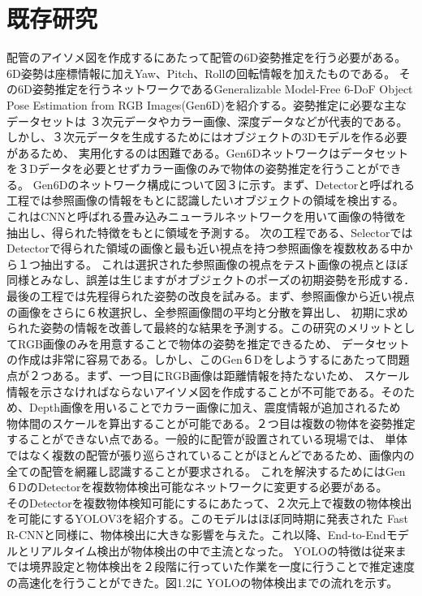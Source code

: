 \section{既存研究}
配管のアイソメ図を作成するにあたって配管の6D姿勢推定を行う必要がある。6D姿勢は座標情報に加えYaw、Pitch、Rollの回転情報を加えたものである。
その6D姿勢推定を行うネットワークであるGeneralizable Model-Free 6-DoF Object Pose Estimation from RGB Images(Gen6D)を紹介する。姿勢推定に必要な主なデータセットは
３次元データやカラー画像、深度データなどが代表的である。しかし、３次元データを生成するためにはオブジェクトの3Dモデルを作る必要があるため、
実用化するのは困難である。Gen6Dネットワークはデータセットを３Dデータを必要とせずカラー画像のみで物体の姿勢推定を行うことができる。
Gen6Dのネットワーク構成について図３に示す。まず、Detectorと呼ばれる工程では参照画像の情報をもとに認識したいオブジェクトの領域を検出する。
これはCNNと呼ばれる畳み込みニューラルネットワークを用いて画像の特徴を抽出し、得られた特徴をもとに領域を予測する。
次の工程である、SelectorではDetectorで得られた領域の画像と最も近い視点を持つ参照画像を複数枚ある中から１つ抽出する。
これは選択された参照画像の視点をテスト画像の視点とほぼ同様とみなし、誤差は生じますがオブジェクトのポーズの初期姿勢を形成する．
最後の工程では先程得られた姿勢の改良を試みる。まず、参照画像から近い視点の画像をさらに６枚選択し、全参照画像間の平均と分散を算出し、
初期に求められた姿勢の情報を改善して最終的な結果を予測する。この研究のメリットとしてRGB画像のみを用意することで物体の姿勢を推定できるため、
データセットの作成は非常に容易である。しかし、このGen６Dをしようするにあたって問題点が２つある。まず、一つ目にRGB画像は距離情報を持たないため、
スケール情報を示さなければならないアイソメ図を作成することが不可能である。そのため、Depth画像を用いることでカラー画像に加え、震度情報が追加されるため
物体間のスケールを算出することが可能である。２つ目は複数の物体を姿勢推定することができない点である。一般的に配管が設置されている現場では、
単体ではなく複数の配管が張り巡らされていることがほとんどであるため、画像内の全ての配管を網羅し認識することが要求される。
これを解決するためにはGen６DのDetectorを複数物体検出可能なネットワークに変更する必要がある。\\
 そのDetectorを複数物体検知可能にするにあたって、２次元上で複数の物体検出を可能にするYOLOV3を紹介する。このモデルはほぼ同時期に発表された
 Fast R-CNNと同様に、物体検出に大きな影響を与えた。これ以降、End-to-Endモデルとリアルタイム検出が物体検出の中で主流となった。
YOLOの特徴は従来までは境界設定と物体検出を２段階に行っていた作業を一度に行うことで推定速度の高速化を行うことができた。図1.2に
YOLOの物体検出までの流れを示す。\\
